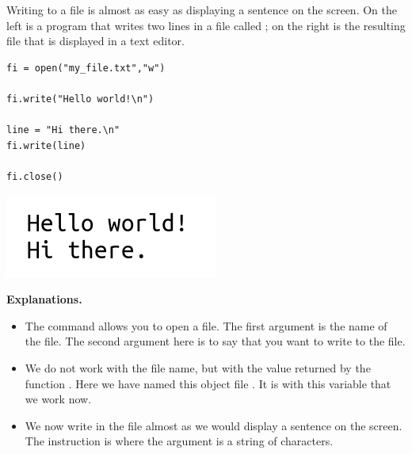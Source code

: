 \documentclass[11pt,class=report,crop=false]{standalone}
\begin{document}



\begin{cours}


Writing to a file is almost as easy as displaying a sentence on the screen.
On the left is a program that writes two lines in a file called ; on the right is the resulting file that is displayed in a text editor.
\begin{center}
\begin{minipage}{0.5\textwidth}
\begin{lstlisting}
fi = open("my_file.txt","w")

fi.write("Hello world!\n")

line = "Hi there.\n"
fi.write(line)

fi.close()
\end{lstlisting}
\end{minipage}
\begin{minipage}{0.3\textwidth}
\includegraphics[scale=\myscale,scale=0.5]{screen-files-lesson-1-en}
\end{minipage}
\end{center}


\textbf{Explanations.}
\begin{itemize}
  \item The command  allows you to open a file. The first argument is the name of the file. The second argument here is  to say that you want to write to the file.
  
  \item We do not work with the file name, but with the value returned by the function . Here we have named this object file . It is with this variable  that we work now.
  
  \item We now write in the file almost as we would display a sentence on the screen. The instruction is  where the argument is a string of characters.
  

\end{itemize}
\end{cours}
\end{document}
